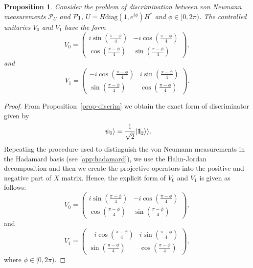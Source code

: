 \documentclass[preprint,12pt, a4paper, dvipsnames]{elsarticle}
\newcommand{\ket}[1]{\ensuremath{|#1\rangle}}
\newcommand{\1}{{\rm 1\hspace{-0.9mm}l}}
\newcommand{\Id}{{\rm 1\hspace{-0.9mm}l}}
\newcommand{\PP}{\mathcal{P}}
\newcommand{\diag}{\mathrm{diag}}
\newtheorem{proposition}{Proposition}
\theoremstyle{definition}
\begin{document}
\begin{proposition}\label{prop:optimal-measurement}
	Consider the problem of discrimination between von Neumann measurements $\PP_U$
	and $\PP_\1$, $U = H\diag(1, e^{i \phi}) H^\dagger $ and $\phi \in [0,
	2\pi)$.
	The   controlled unitaries $V_0$ and $V_1$
	have the form
	\begin{equation}
	V_0 = \left(\begin{array}{cc}i \sin\left( \frac{\pi - \phi}{4} \right)&-i
	\cos\left( \frac{\pi - \phi}{4} \right)\\ \cos\left( \frac{\pi -
		\phi}{4}\right)& \sin\left( \frac{\pi - \phi}{4} \right)\end{array}\right),
	\end{equation}
	and
	\begin{equation}
	V_1 = \left(\begin{array}{cc}-i \cos\left(\frac{\pi - \phi}{4}\right) &i
	\sin\left( \frac{\pi - \phi}{4}\right)\\\sin\left( \frac{\pi - \phi}{4} \right)
	&  \cos\left( \frac{\pi - \phi}{4} \right) \end{array}\right).
	\end{equation}
\end{proposition}

\begin{proof}
	From Proposition~\ref{prop-discrim} we obtain the exact form of discriminator given by
	\begin{equation}
	\ket{\psi_0}  = \frac{1}{\sqrt{2}} |\Id_2
	\rangle \rangle.
	\end{equation}
	Repeating the procedure used to distinguish the von Neumann measurements in the Hadamard basis (see \ref{app:hadamard}), we use the Hahn-Jordan decomposition and then we create the projective operators into the positive and negative part of $X$ matrix.
	Hence, the explicit form of $V_0$ and $V_1$ is given as
	follows: 
	\begin{equation}
	V_0 = \left(
	\begin{array}{cc}i \sin\left( \frac{\pi - \phi}{4} \right)&-i
	\cos\left( \frac{\pi - \phi}{4} \right)\\ \cos\left( \frac{\pi -
		\phi}{4}\right)& \sin\left( \frac{\pi - \phi}{4} \right)
	\end{array}
	\right),
	\end{equation}
and
	\begin{equation}
	V_1 = \left(\begin{array}{cc}-i \cos\left(\frac{\pi - \phi}{4}\right) &i
	\sin\left( \frac{\pi - \phi}{4}\right)\\\sin\left( \frac{\pi - \phi}{4}
	\right) &  \cos\left( \frac{\pi - \phi}{4} \right) \end{array}\right),
	\end{equation}
	where $\phi \in [0,2\pi)$.
\end{proof}
\end{document}
